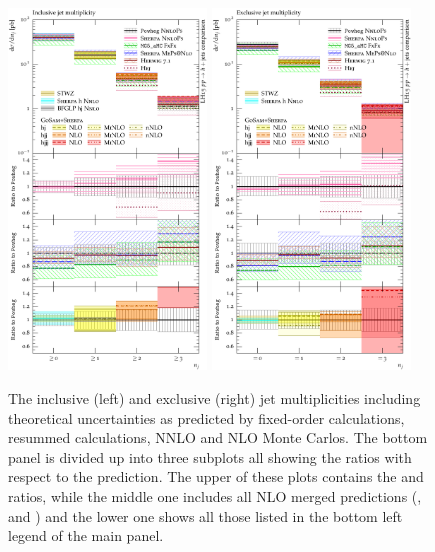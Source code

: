 \begin{figure}[t!]
  \centering
  \includegraphics[width=0.47\textwidth]{figures/hjetscomp_NJet_incl_30.pdf}
  \hfill
  \includegraphics[width=0.47\textwidth]{figures/hjetscomp_NJet_excl_30.pdf}
  \caption{\label{fig:hjetscomp:results:inclobs:njets}%
    The inclusive (left) and exclusive (right) jet multiplicities
    including theoretical uncertainties as predicted by fixed-order
    calculations, resummed calculations, NNLO and NLO Monte Carlos. The
    bottom panel is divided up into three subplots all showing the
    ratios with respect to the \Powheg \NNLOPS prediction. The upper of these plots
    contains the \Hej and \Sherpa \NNLOPS ratios, while the middle one
    includes all NLO merged predictions (\MGaMC, \Herwig and \Sherpa)
    and the lower one shows all those listed in the bottom left legend
    of the main panel.}
\end{figure}

